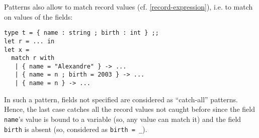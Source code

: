 \smallskip
Patterns also allow to match record values
(cf. \ref{record-expression}), i.e. to match on values of the fields:
{\scriptsize
\begin{lstlisting}
type t = { name : string ; birth : int } ;;
let r = ... in
let x =
  match r with
   | { name = "Alexandre" } -> ...
   | { name = n ; birth = 2003 } -> ...
   | { name = n } -> ...
\end{lstlisting}
}
In such a pattern, fields not specified are considered as
``catch-all'' patterns. Hence, the last case catches all the record
values not caught before since the field {\tt name}'s value is bound
to a variable (so, any value can match it) and the field
{\tt birth} is absent (so, considered as {\tt birth = \_}).



